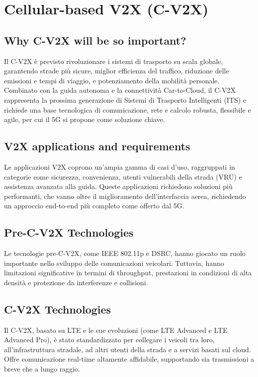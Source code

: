 \section{Cellular-based V2X (C-V2X)}

\subsection{Why C-V2X will be so important?}
Il C-V2X è previsto rivoluzionare i sistemi di trasporto su scala globale, garantendo
strade più sicure, miglior efficienza del traffico, riduzione delle emissioni e tempi di
viaggio, e potenziamento della mobilità personale. Combinato con la guida autonoma e la
connettività Car-to-Cloud, il C-V2X rappresenta la prossima generazione di Sistemi di
Trasporto Intelligenti (ITS) e richiede una base tecnologica di comunicazione, rete e
calcolo robusta, flessibile e agile, per cui il 5G si propone come soluzione chiave.

\subsection{V2X applications and requirements}
Le applicazioni V2X coprono un'ampia gamma di casi d'uso, raggruppati in categorie come
sicurezza, convenienza, utenti vulnerabili della strada (VRU) e assistenza avanzata alla
guida. Queste applicazioni richiedono soluzioni più performanti, che vanno oltre il
miglioramento dell'interfaccia aerea, richiedendo un approccio end-to-end più completo
come offerto dal 5G.

\subsection{Pre-C-V2X Technologies}
Le tecnologie pre-C-V2X, come IEEE 802.11p e DSRC, hanno giocato un ruolo importante nello
sviluppo delle comunicazioni veicolari. Tuttavia, hanno limitazioni significative in
termini di throughput, prestazioni in condizioni di alta densità e protezione da
interferenze e collisioni.

\subsection{C-V2X Technologies}
Il C-V2X, basato su LTE e le sue evoluzioni (come LTE Advanced e LTE Advanced Pro), è
stato standardizzato per collegare i veicoli tra loro, all'infrastruttura stradale, ad
altri utenti della strada e a servizi basati sul cloud. Offre comunicazione real-time
altamente affidabile, supportando sia trasmissioni a breve che a lungo raggio.

